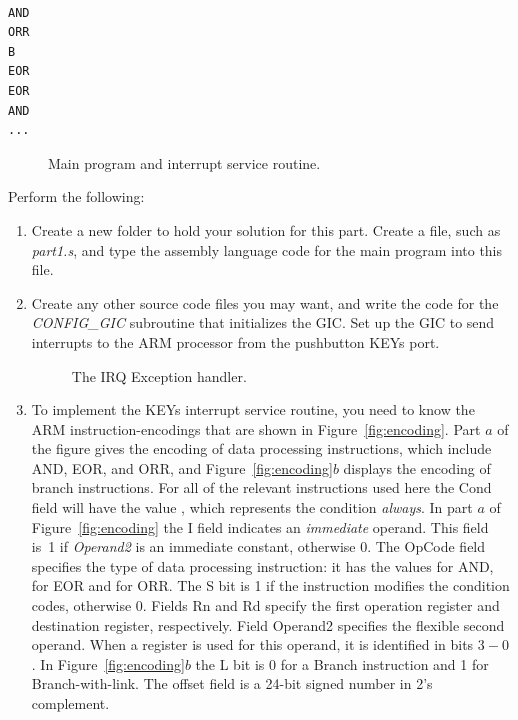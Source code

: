 \documentclass[epsfig,10pt,fullpage]{article}
\begin{document}
~\\
\begin{minipage}[t]{12.5 cm}
\begin{lstlisting}
AND
ORR
B
EOR
EOR
AND
...
\end{lstlisting}
\end{minipage}

\begin{figure}[H]
\begin{center}

\end{center}
\caption{Main program and interrupt service routine.}
\label{fig:code}
\end{figure}

\noindent
Perform the following:

\begin{enumerate}
\item Create a new folder to hold your solution for this part. Create a
file, such as {\it part1.s}, and type the assembly language code for the main program 
into this file. 

\item Create any other source code files you may want, and write the code for the
{\it CONFIG\_GIC} subroutine that initializes the GIC. Set up the GIC to send interrupts
to the ARM processor from the pushbutton KEYs port. 

\begin{figure}[t]
\begin{center}

\end{center}
\caption{The IRQ Exception handler.}
\label{fig:handler}
\end{figure}

\item 
To implement the KEYs interrupt service routine, you need to know the ARM
instruction-encodings that are shown in Figure~\ref{fig:encoding}.  Part $a$ of the figure 
gives the encoding of data processing instructions, which include AND, EOR, and 
ORR, and Figure~\ref{fig:encoding}$b$ displays the encoding of branch instructions. 
For all of the relevant instructions used here the {\sf Cond} 
field will have the value {}, which 
represents the condition {\it always}.  In part $a$ of Figure~\ref{fig:encoding}
the {\sf I} field indicates an {\it immediate} operand. This field is~1 if {\it Operand2}
is an immediate constant, otherwise 0. The {\sf OpCode} field specifies the type of data
processing instruction: it has the values {} for AND, {} for EOR and 
{} for ORR. The {\sf S} bit is 1 if the instruction modifies the condition codes, 
otherwise 0. Fields {\sf Rn} and {\sf Rd} specify the first operation register and destination 
register, respectively.  Field {\sf Operand2} specifies the flexible second operand. When 
a register is used for this operand, it is identified in bits $3-0$. In 
Figure~\ref{fig:encoding}$b$ the {\sf L} bit is 0 for a Branch instruction and 1 for 
Branch-with-link.  The {\sf offset} field is a 24-bit signed number in 2's complement.


\end{enumerate}
\end{document}

